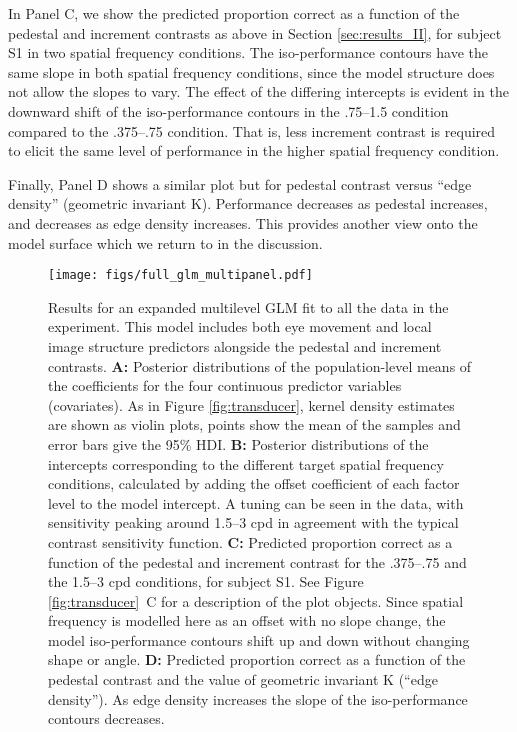\documentclass[11pt,a4paper]{article}
\begin{document}
{In Panel C, we show the predicted proportion correct as a function of the pedestal and increment contrasts as above in Section \ref{sec:results_II}, for subject S1 in two spatial frequency conditions.
The iso-performance contours have the same slope in both spatial frequency conditions, since the model structure does not allow the slopes to vary.
The effect of the differing intercepts is evident in the downward shift of the iso-performance contours in the .75--1.5 condition compared to the .375--.75 condition.
That is, less increment contrast is required to elicit the same level of performance in the higher spatial frequency condition.

Finally, Panel D shows a similar plot but for pedestal contrast versus ``edge density'' (geometric invariant K).
Performance decreases as pedestal increases, and decreases as edge density increases.
This provides another view onto the model surface which we return to in the discussion.

\begin{figure}[H]
\begin{center}
\texttt{[image: figs/full\_glm\_multipanel.pdf]}
\end{center}
\caption{
Results for an expanded multilevel GLM fit to all the data in the experiment.
This model includes both eye movement and local image structure predictors alongside the pedestal and increment contrasts.
\textbf{A:} Posterior distributions of the population-level means of the coefficients for the four continuous predictor variables (covariates).
As in Figure \ref{fig:transducer}, kernel density estimates are shown as violin plots, points show the mean of the samples and error bars give the 95\% HDI.
\textbf{B:} Posterior distributions of the intercepts corresponding to the different target spatial frequency conditions, calculated by adding the offset coefficient of each factor level to the model intercept.
A tuning can be seen in the data, with sensitivity peaking around 1.5--3 cpd in agreement with the typical contrast sensitivity function.
\textbf{C:} Predicted proportion correct as a function of the pedestal and increment contrast for the .375--.75 and the 1.5--3 cpd conditions, for subject S1.
See Figure \ref{fig:transducer}~C for a description of the plot objects.
Since spatial frequency is modelled here as an offset with no slope change, the model iso-performance contours shift up and down without changing shape or angle.
\textbf{D:} Predicted proportion correct as a function of the pedestal contrast and the value of geometric invariant K (``edge density'').
As edge density increases the slope of the iso-performance contours decreases.
}
\label{fig:full_glm}
\end{figure}

}
\end{document}
